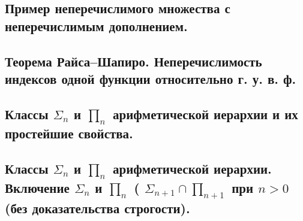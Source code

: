 \documentclass[a4paper, 10pt]{article}
\begin{document}
\subsection{Пример неперечислимого множества с неперечислимым дополнением.}

\subsection{Теорема Райса–Шапиро. Неперечислимость индексов одной функции относительно г. у. в. ф.}

\subsection{Классы $\Sigma_n$ и $\prod_n$ арифметической иерархии и их простейшие свойства.}

\subsection{Классы $\Sigma_n$ и $\prod_n$ арифметической иерархии. Включение $\Sigma_n$ и $\prod_n$ ( $\Sigma_{n+1} \cap \prod_{n+1}$ при $n > 0$ (без доказательства строгости).}
\end{document}

